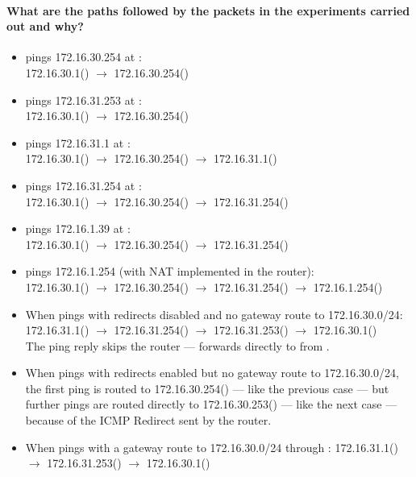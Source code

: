 \documentclass[compilation.tex]{subfiles}
\begin{document}
\paragraph{What are the paths followed by the packets in the experiments carried out and why?}
\begin{itemize}[noitemsep,leftmargin=*,topsep=0pt]
\item {} pings 172.16.30.254 at :\\
172.16.30.1() $\rightarrow$ 172.16.30.254()
\item {} pings 172.16.31.253 at :\\
172.16.30.1() $\rightarrow$ 172.16.30.254()
\item {} pings 172.16.31.1 at :\\
172.16.30.1() $\rightarrow$ 172.16.30.254() $\rightarrow$ 172.16.31.1()
\item {} pings 172.16.31.254 at :\\
172.16.30.1() $\rightarrow$ 172.16.30.254() $\rightarrow$ 172.16.31.254()
\item {} pings 172.16.1.39 at :\\
172.16.30.1() $\rightarrow$ 172.16.30.254() $\rightarrow$ 172.16.31.254()
\item {} pings 172.16.1.254 (with NAT implemented in the router):\\
172.16.30.1() $\rightarrow$ 172.16.30.254() $\rightarrow$ 172.16.31.254() $\rightarrow$ 172.16.1.254()
\item When  pings  with redirects disabled and no gateway route to 172.16.30.0/24:
172.16.31.1() $\rightarrow$ 172.16.31.254() $\rightarrow$ 172.16.31.253() $\rightarrow$ 172.16.30.1()\\
The ping reply skips the router ---  forwards directly to  from .
\item When  pings  with redirects enabled but no gateway route to 172.16.30.0/24, the first ping is routed to 172.16.30.254() --- like the previous case --- but further pings are routed directly to 172.16.30.253() --- like the next case --- because of the ICMP Redirect sent by the router.
\item When  pings  with a gateway route to 172.16.30.0/24 through :
172.16.31.1() $\rightarrow$ 172.16.31.253() $\rightarrow$ 172.16.30.1()
\end{itemize}
\end{document}

